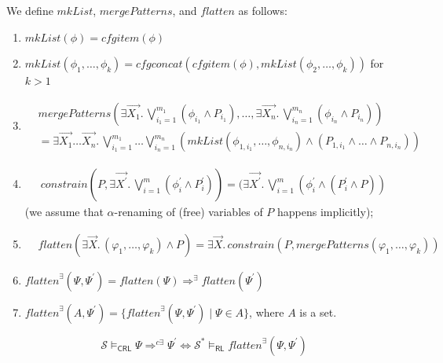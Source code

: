 \documentclass{article}
\newcommand{\RL}{\mathsf{RL}}
\newcommand{\CRL}{\mathsf{CRL}}
\begin{document}
\begin{definition}
We define $\mathit{mkList}$, $\mathit{mergePatterns}$, and $\mathit{flatten}$ as follows:
\begin{enumerate}
    \item $\mathit{mkList}(\phi) = \mathit{cfgitem}(\phi)$
    \item $\mathit{mkList}(\phi_1, \ldots, \phi_k) = \mathit{cfgconcat}(\mathit{cfgitem}(\phi), \mathit{mkList}(\phi_2, \ldots, \phi_k))$ for $k > 1$
    \item
    \begin{align*}
     & \mathit{mergePatterns}(\exists \vec{X_1}.\, \bigvee_{i_{1}=1}^{m_1} (\phi_{i_1} \land P_{i_1}),
     \ldots, \exists \vec{X_n}.\, \bigvee_{i_{n}=1}^{m_n} (\phi_{i_n} \land P_{i_n}))
     \\ & = \exists \vec{X_1}\ldots\vec{X_n}.\, \bigvee_{i_{1}=1}^{m_1} \ldots \bigvee_{i_{n}=1}^{m_n}
       (\mathit{mkList}(\phi_{1, i_1}, \ldots, \phi_{n, i_n}) \land (P_{1, i_1} \land \ldots \land P_{n, i_n}))
    \end{align*}
    \item
        \begin{align*}
            \mathit{constrain}(P, \exists \vec{X^\prime} .\,
            \bigvee_{i=1}^{m} (\phi^\prime_i \land P^\prime_i))
            = (\exists \vec{X^\prime}.\, \bigvee_{i=1}^{m}(\phi^\prime_i \land (P^\prime_i \land P))
    \end{align*}
    (we assume that $\alpha$-renaming of (free) variables of $P$ happens implicitly);
    \item
        \begin{align*}
            & \mathit{flatten}(\exists \vec{X}.\, (\varphi_1, \ldots, \varphi_k) \land P)
            = \exists \vec{X}.\, \mathit{constrain}(P, \mathit{mergePatterns}(\varphi_1, \ldots, \varphi_k))
    \end{align*}
    \item $\mathit{flatten}^\exists(\Psi, \Psi^\prime) = \mathit{flatten}(\Psi) \Rightarrow^\exists \mathit{flatten}(\Psi^\prime)$
    \item $\mathit{flatten}^\exists(A, \Psi^\prime) = \{ \mathit{flatten}^\exists(\Psi, \Psi^\prime) \mid \Psi \in A \}$, where $A$ is a set.
\end{enumerate}
\end{definition}

\begin{theorem}\label{thm:correspondence}
\begin{equation*}
\mathcal{S} \vDash_{\CRL} \Psi \Rightarrow^{c\exists} \Psi^\prime \iff \mathcal{S}^* \vDash_\RL \mathit{flatten}^\exists(\Psi, \Psi^\prime)
\end{equation*}
\end{theorem}
\end{document}
